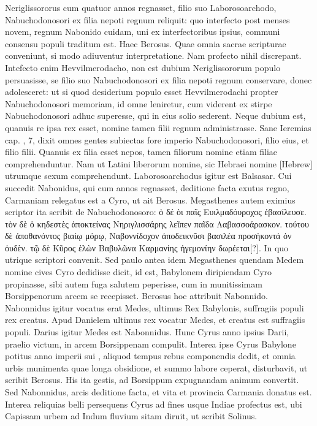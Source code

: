 Neriglissororus cum quatuor annos regnasset,
filio suo Laborosoarchodo, Nabuchodonosori ex filia nepoti
regnum reliquit: quo interfecto post menses novem, regnum Nabonido
cuidam, uni ex interfectoribus ipsius, communi consensu
populi traditum est.
Haec Berosus.
Quae omnia sacrae scripturae conveniunt,
si modo adiuventur interpretatione.
Nam profecto nihil
discrepant.
Intefecto enim Hevvilmerodacho, non est dubium
Neriglissororum populo persuasisse, se filio suo Nabuchodonosori
ex filia nepoti regnum conservare, donec adolesceret: ut si quod
desiderium populo esset Hevvilmerodachi propter Nabuchodonosori
memoriam, id omne leniretur, cum viderent ex stirpe Nabuchodonosori
adhuc superesse, qui in eius solio sederent.
Neque dubium est, quanuis re ipsa rex esset, nomine tamen filii regnum
administrasse.
Sane Ieremias cap. , 7, dixit omnes gentes subiectas
fore imperio Nabuchodonosori, filio eius, et filio filii.
Quanuis ex filia esset nepos, tamen filiorum nomine etiam filiae
 comprehenduntur.
Nam ut Latini liberorum nomine, sic Hebraei nomine
\texthebrew{[Hebrew]} utrumque sexum comprehendunt.
Laborosoarchodus igitur
est Balsasar.
Cui succedit Nabonidus, qui cum annos  regnasset,
deditione facta exutus regno, Carmaniam relegatus est a Cyro,
ut ait Berosus.
Megasthenes autem eximius scriptor ita scribit de
Nabuchodonosoro: \textgreek{ὁ δέ ὁι παῖς Ευιλμαδόυροχος ἐβασίλευσε. τὸν δὲ ὁ
κηδεστὲς ἀποκτείνας Νηριγλισσάρης λεῖπεν παῖδα Λαβασσοάρασκον. τούτου δὲ
ἀποθανόντος βιαίῳ μόρῳ, Ναβοννίδοχον ἀποδεικνῦσι βασιλέα προσήκοντά
ὁν ὀυδὲν. τῷ δὲ Κῦρος ἑλὼν Βαβυλῶνα Καρμανίης ἡγεμονίην δωρέεται[?]}.
In
quo utrique scriptori convenit.
Sed paulo antea idem Megasthenes
quendam Medem nomine cives Cyro dedidisse dicit, id est, Babylonem
diripiendam Cyro propinasse, sibi autem fuga salutem peperisse,
cum in munitissimam Borsippenorum arcem se recepisset.
Berosus hoc attribuit Nabonnido.
Nabonnidus igitur vocatus erat
Medes, ultimus Rex Babylonis, suffragiis populi rex creatus.
Apud
Danielem ultimus rex vocatur Medes, et creatus est suffragiis populi.
Darius igitur Medes est Nabonnidus.
Hunc Cyrus anno 
ipsius Darii, praelio victum, in arcem Borsippenam compulit.
Interea ipse Cyrus Babylone potitus anno imperii sui
 , aliquod
tempus rebus componendis dedit, et omnia urbis munimenta
quae longa obsidione, et summo labore ceperat, disturbavit, ut
scribit Berosus.
His ita gestis, ad Borsippum expugnandam animum
convertit.
Sed Nabonnidus, arcis deditione facta, et vita
et provincia Carmania donatus est.
Interea reliquias belli persequens
Cyrus ad fines usque Indiae profectus est, ubi Capissam urbem
ad Indum fluvium sitam diruit, ut scribit Solinus.

